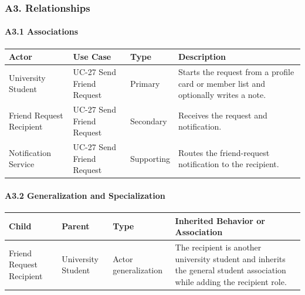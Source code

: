 \documentclass[12pt]{article}
\renewcommand{\baselinestretch}{1.5}
\begin{document}
\hypertarget{sec:a3-relationships}{}
\subsubsection*{A3. Relationships}
\par\medskip

\hypertarget{sec:a3-1-associations}{}
\paragraph*{A3.1 Associations}
\par\medskip

\begingroup
\small
\renewcommand{\baselinestretch}{1.0}\selectfont
\renewcommand{\arraystretch}{1.15}
\setlength{\tabcolsep}{6pt}
\begin{longtable}{|>{\raggedright\arraybackslash}p{}|>{\raggedright\arraybackslash}p{}|>{\raggedright\arraybackslash}p{}|>{\raggedright\arraybackslash}p{}|}
\hline
\textbf{Actor} & \textbf{Use Case} & \textbf{Type} & \textbf{Description} \\ \hline
\endhead
University Student & UC-27 Send Friend Request & Primary & Starts the request from a profile card or member list and optionally writes a note. \\ \hline
Friend Request Recipient & UC-27 Send Friend Request & Secondary & Receives the request and notification. \\ \hline
Notification Service & UC-27 Send Friend Request & Supporting & Routes the friend-request notification to the recipient. \\ \hline
\end{longtable}
\endgroup
\par\medskip

\hypertarget{sec:a3-2-generalization-and-specialization}{}
\paragraph*{A3.2 Generalization and Specialization}
\par\medskip

\begingroup
\small
\renewcommand{\baselinestretch}{1.0}\selectfont
\renewcommand{\arraystretch}{1.15}
\setlength{\tabcolsep}{6pt}
\begin{longtable}{|>{\raggedright\arraybackslash}p{}|>{\raggedright\arraybackslash}p{}|>{\raggedright\arraybackslash}p{}|>{\raggedright\arraybackslash}p{}|}
\hline
\textbf{Child} & \textbf{Parent} & \textbf{Type} & \textbf{Inherited Behavior or Association} \\ \hline
\endhead
Friend Request Recipient & University Student & Actor generalization & The recipient is another university student and inherits the general student association while adding the recipient role. \\ \hline
\end{longtable}
\endgroup
\par\medskip
\end{document}
